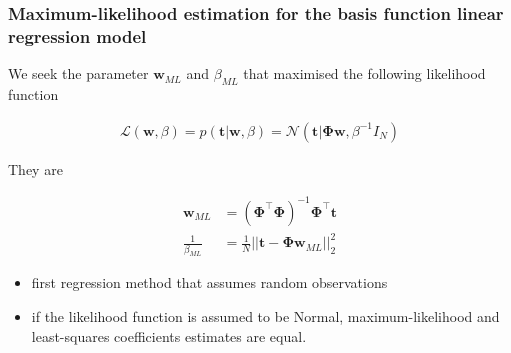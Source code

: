 \documentclass[11pt]{beamer}
\begin{document}
\begin{frame}
    \frametitle{Maximum-likelihood estimation for the basis function linear
    regression model}

    \footnotesize
    We seek the parameter $\mathbf{w}_{ML}$ and $\beta_{ML}$ that maximised the following likelihood function

    \begin{align}
        \mathcal{L}(\mathbf{w},\beta)=p(\mathbf{t}|\mathbf{w},\beta)=\mathcal{N}(\mathbf{t}|\boldsymbol{\Phi}\mathbf{w},\beta^{-1}I_N)\label{eq:likelihoodLinearRegression}
    \end{align}

    They are

    \begin{align}
        \mathbf{w}_{ML}&=(\boldsymbol{\Phi}^\intercal\boldsymbol{\Phi})^{-1}\boldsymbol{\Phi}^\intercal\mathbf{t}\label{eq:wML}\\
        \frac{1}{\beta_{ML}}&=\frac{1}{N}||\mathbf{t}-\boldsymbol{\Phi}\mathbf{w}_{ML}||_2^2\label{eq:betaML}
    \end{align}

	\begin{itemize}

		\item first regression method that assumes random observations

		\item if the likelihood function is assumed to be Normal,
		maximum-likelihood and least-squares coefficients estimates are equal.

	\end{itemize}

    \normalsize

\end{frame}
\end{document}
